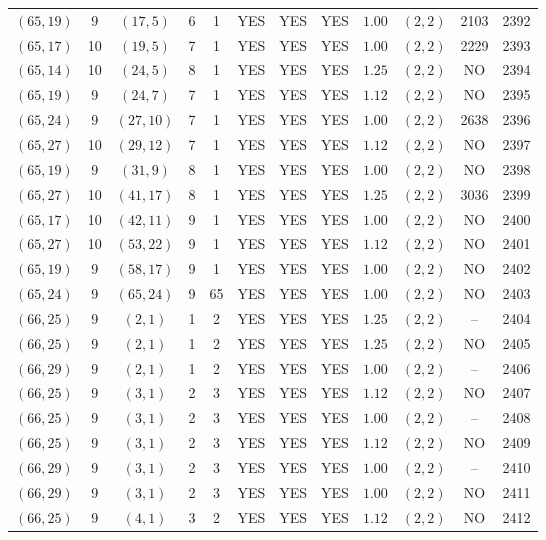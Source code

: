 \begin{longtable}{|c|c|c|c|c|c|c|c|c|c|c|c|}
$(65,19)$ & 9 & $(17,5)$ & 6 & 1 & YES & YES & YES & $1.00$ & $(2,2)$ & 2103 & 2392\\
$(65,17)$ & 10 & $(19,5)$ & 7 & 1 & YES & YES & YES & $1.00$ & $(2,2)$ & 2229 & 2393\\
$(65,14)$ & 10 & $(24,5)$ & 8 & 1 & YES & YES & YES & $1.25$ & $(2,2)$ & NO & 2394\\
$(65,19)$ & 9 & $(24,7)$ & 7 & 1 & YES & YES & YES & $1.12$ & $(2,2)$ & NO & 2395\\
$(65,24)$ & 9 & $(27,10)$ & 7 & 1 & YES & YES & YES & $1.00$ & $(2,2)$ & 2638 & 2396\\
$(65,27)$ & 10 & $(29,12)$ & 7 & 1 & YES & YES & YES & $1.12$ & $(2,2)$ & NO & 2397\\
$(65,19)$ & 9 & $(31,9)$ & 8 & 1 & YES & YES & YES & $1.00$ & $(2,2)$ & NO & 2398\\
$(65,27)$ & 10 & $(41,17)$ & 8 & 1 & YES & YES & YES & $1.25$ & $(2,2)$ & 3036 & 2399\\
$(65,17)$ & 10 & $(42,11)$ & 9 & 1 & YES & YES & YES & $1.00$ & $(2,2)$ & NO & 2400\\
$(65,27)$ & 10 & $(53,22)$ & 9 & 1 & YES & YES & YES & $1.12$ & $(2,2)$ & NO & 2401\\
$(65,19)$ & 9 & $(58,17)$ & 9 & 1 & YES & YES & YES & $1.00$ & $(2,2)$ & NO & 2402\\
$(65,24)$ & 9 & $(65,24)$ & 9 & 65 & YES & YES & YES & $1.00$ & $(2,2)$ & NO & 2403\\
$(66,25)$ & 9 & $(2,1)$ & 1 & 2 & YES & YES & YES & $1.25$ & $(2,2)$ & -- & 2404\\
$(66,25)$ & 9 & $(2,1)$ & 1 & 2 & YES & YES & YES & $1.25$ & $(2,2)$ & NO & 2405\\
$(66,29)$ & 9 & $(2,1)$ & 1 & 2 & YES & YES & YES & $1.00$ & $(2,2)$ & -- & 2406\\
$(66,25)$ & 9 & $(3,1)$ & 2 & 3 & YES & YES & YES & $1.12$ & $(2,2)$ & NO & 2407\\
$(66,25)$ & 9 & $(3,1)$ & 2 & 3 & YES & YES & YES & $1.00$ & $(2,2)$ & -- & 2408\\
$(66,25)$ & 9 & $(3,1)$ & 2 & 3 & YES & YES & YES & $1.12$ & $(2,2)$ & NO & 2409\\
$(66,29)$ & 9 & $(3,1)$ & 2 & 3 & YES & YES & YES & $1.00$ & $(2,2)$ & -- & 2410\\
$(66,29)$ & 9 & $(3,1)$ & 2 & 3 & YES & YES & YES & $1.00$ & $(2,2)$ & NO & 2411\\
$(66,25)$ & 9 & $(4,1)$ & 3 & 2 & YES & YES & YES & $1.12$ & $(2,2)$ & NO & 2412\\

\end{longtable}

